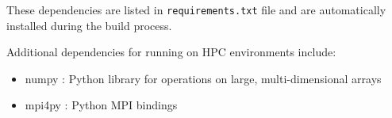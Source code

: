 These dependencies are listed in \texttt{requirements.txt} file
and are automatically installed during the build process.

Additional dependencies for running \systemname on HPC environments
include:
\begin{itemize}
\item numpy  : Python library for operations on large, multi-dimensional arrays
\item mpi4py : Python MPI bindings
\end{itemize}

